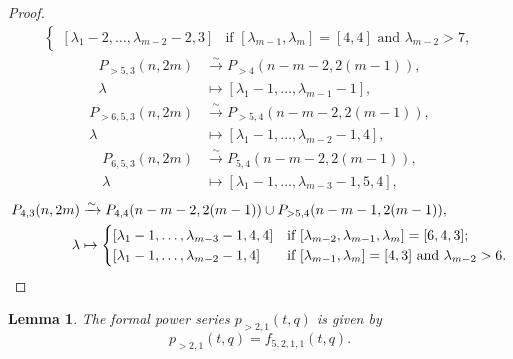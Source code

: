 \documentclass[a4paper, 12pt, reqno]{amsart}
\newtheorem{lemma}[theorem]{Lemma}
\theoremstyle{remark}
\begin{document}
\begin{proof}
\begin{align*}
\begin{cases}
                [\lambda_1 - 2, \dots, \lambda_{m - 2} - 2, 3] &\text{if $[\lambda_{m - 1}, \lambda_m] = [4, 4]$ and $\lambda_{m - 2} > 7$},
              \end{cases}
  \end{align*}
  \begin{align*}
    P_{>5, 3}(n, 2m) &\xrightarrow{\sim} P_{>4}(n - m - 2, 2(m - 1)), \\
    \lambda &\mapsto [\lambda_1 - 1, \dots, \lambda_{m - 1} - 1],
  \end{align*}
  \begin{align*}
    P_{>6, 5, 3}(n, 2m) &\xrightarrow{\sim} P_{>5, 4}(n - m - 2, 2(m - 1)), \\
    \lambda &\mapsto [\lambda_1 - 1, \dots, \lambda_{m - 2} - 1, 4],
  \end{align*}
  \begin{align*}
    P_{6, 5, 3}(n, 2m) &\xrightarrow{\sim} P_{5, 4}(n - m - 2, 2(m - 1)), \\
    \lambda &\mapsto [\lambda_1 - 1, \dots, \lambda_{m - 3} - 1, 5, 4],
  \end{align*}
  \begin{align*}
    P_{4, 3}(n, 2m) &\xrightarrow{\sim} P_{4, 4}(n - m - 2, 2(m - 1)) \cup P_{>5, 4}(n - m - 1, 2(m - 1)), \\
    \lambda &\mapsto
              \begin{cases}
                [\lambda_1 - 1, \dots, \lambda_{m - 3} - 1, 4, 4] &\text{if $[\lambda_{m - 2}, \lambda_{m - 1}, \lambda_m] = [6, 4, 3]$}; \\
                [\lambda_1 - 1, \dots, \lambda_{m - 2} - 1, 4] &\text{if $[\lambda_{m - 1}, \lambda_m] = [4, 3]$ and $\lambda_{m - 2} > 6$}. \qedhere
              \end{cases}
  \end{align*}
\end{proof}

\begin{lemma}
  \label{lmm:31}
  The formal power series $p_{>2, 1}(t, q)$ is given by
  \begin{equation*}
    p_{>2, 1}(t, q) = f_{5, 2, 1, 1}(t, q).
  \end{equation*}
\end{lemma}
\end{document}
